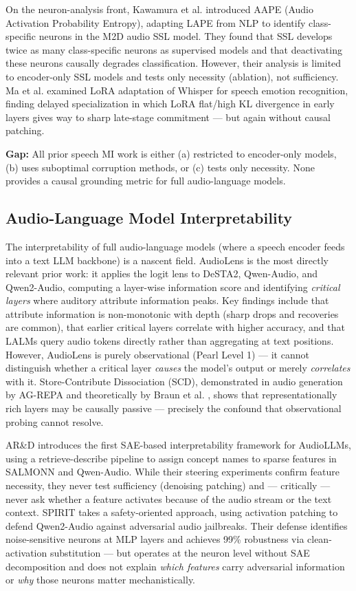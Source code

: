 \documentclass[a4paper]{article}
\begin{document}
On the neuron-analysis front, Kawamura et al. \cite{arxiv_2602.15307} introduced AAPE (Audio Activation Probability Entropy), adapting LAPE from NLP to identify class-specific neurons in the M2D audio SSL model. They found that SSL develops twice as many class-specific neurons as supervised models and that deactivating these neurons causally degrades classification. However, their analysis is limited to encoder-only SSL models and tests only necessity (ablation), not sufficiency. Ma et al. \cite{ma2026} examined LoRA adaptation of Whisper for speech emotion recognition, finding delayed specialization in which LoRA flat/high KL divergence in early layers gives way to sharp late-stage commitment — but again without causal patching.

\textbf{Gap:} All prior speech MI work is either (a) restricted to encoder-only models, (b) uses suboptimal corruption methods, or (c) tests only necessity. None provides a causal grounding metric for full audio-language models.

\subsection{Audio-Language Model Interpretability}

The interpretability of full audio-language models (where a speech encoder feeds into a text LLM backbone) is a nascent field. AudioLens \cite{ho2025} is the most directly relevant prior work: it applies the logit lens to DeSTA2, Qwen-Audio, and Qwen2-Audio, computing a layer-wise information score and identifying \textit{critical layers} where auditory attribute information peaks. Key findings include that attribute information is non-monotonic with depth (sharp drops and recoveries are common), that earlier critical layers correlate with higher accuracy, and that LALMs query audio tokens directly rather than aggregating at text positions. However, AudioLens is purely observational (Pearl Level 1) — it cannot distinguish whether a critical layer \textit{causes} the model's output or merely \textit{correlates} with it. Store-Contribute Dissociation (SCD), demonstrated in audio generation by AG-REPA \cite{arxiv_2603.01006} and theoretically by Braun et al. \cite{ref2025}, shows that representationally rich layers may be causally passive — precisely the confound that observational probing cannot resolve.

AR\&D \cite{chowdhury2026} introduces the first SAE-based interpretability framework for AudioLLMs, using a retrieve-describe pipeline to assign concept names to sparse features in SALMONN and Qwen-Audio. While their steering experiments confirm feature necessity, they never test sufficiency (denoising patching) and — critically — never ask whether a feature activates because of the audio stream or the text context. SPIRIT \cite{djanibekov2025} takes a safety-oriented approach, using activation patching to defend Qwen2-Audio against adversarial audio jailbreaks. Their defense identifies noise-sensitive neurons at MLP layers and achieves 99\% robustness via clean-activation substitution — but operates at the neuron level without SAE decomposition and does not explain \textit{which features} carry adversarial information or \textit{why} those neurons matter mechanistically.
\end{document}
